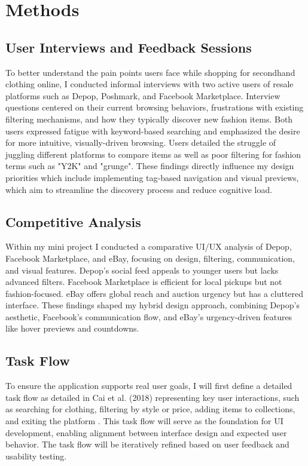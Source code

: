 \documentclass[10pt,twocolumn]{article}
\begin{document}
\section{Methods}
\subsection{User Interviews and Feedback Sessions}
To better understand the pain points users face while shopping for secondhand clothing online, I conducted informal interviews with two active users of resale platforms such as Depop, Poshmark, and Facebook Marketplace. Interview questions centered on their current browsing behaviors, frustrations with existing filtering mechanisms, and how they typically discover new fashion items. Both users expressed fatigue with keyword-based searching and emphasized the desire for more intuitive, visually-driven browsing. Users detailed the struggle of juggling different platforms to compare items as well as poor filtering for fashion terms such as "Y2K" and "grunge". These findings directly influence my design priorities which include implementing tag-based navigation and visual previews, which aim to streamline the discovery process and reduce cognitive load.
\subsection{Competitive Analysis}
Within my mini project I conducted a comparative UI/UX analysis of Depop, Facebook Marketplace, and eBay, focusing on design, filtering, communication, and visual features. Depop’s social feed appeals to younger users but lacks advanced filters. Facebook Marketplace is efficient for local pickups but not fashion-focused. eBay offers global reach and auction urgency but has a cluttered interface. These findings shaped my hybrid design approach, combining Depop’s aesthetic, Facebook’s communication flow, and eBay’s urgency-driven features like hover previews and countdowns.
\subsection{Task Flow}
To ensure the application supports real user goals, I will first define a detailed task flow as detailed in Cai et al. (2018)  representing key user interactions, such as searching for clothing, filtering by style or price, adding items to collections, and exiting the platform \cite{cai2018}. This task flow will serve as the foundation for UI development, enabling alignment between interface design and expected user behavior. The task flow will be iteratively refined based on user feedback and usability testing.
\end{document}
